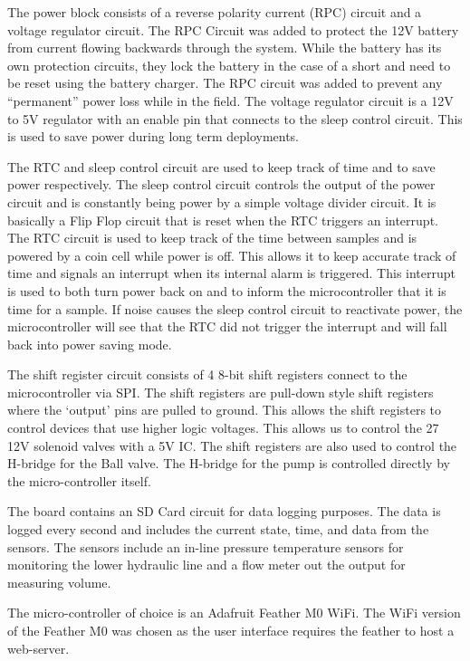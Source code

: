 \documentclass[11pt, letterpaper]{article}
\begin{document}
The power block consists of a reverse polarity current (RPC) circuit and a voltage regulator circuit. The RPC Circuit was added to protect the 12V battery from current flowing backwards through the system. While the battery has its own protection circuits, they lock the battery in the case of a short and need to be reset using the battery charger. The RPC circuit was added to prevent any “permanent” power loss while in the field. The voltage regulator circuit is a 12V to 5V regulator with an enable pin that connects to the sleep control circuit. This is used to save power during long term deployments. 
\newline\par\noindent
The RTC and sleep control circuit are used to keep track of time and to save power respectively. The sleep control circuit controls the output of the power circuit and is constantly being power by a simple voltage divider circuit. It is basically a Flip Flop circuit that is reset when the RTC triggers an interrupt. The RTC circuit is used to keep track of the time between samples and is powered by a coin cell while power is off. This allows it to keep accurate track of time and signals an interrupt when its internal alarm is triggered. This interrupt is used to both turn power back on and to inform the microcontroller that it is time for a sample. If noise causes the sleep control circuit to reactivate power, the microcontroller will see that the RTC did not trigger the interrupt and will fall back into power saving mode. 
\newline\par\noindent
The shift register circuit consists of 4 8-bit shift registers connect to the microcontroller via SPI. The shift registers are pull-down style shift registers where the ‘output’ pins are pulled to ground. This allows the shift registers to control devices that use higher logic voltages. This allows us to control the 27 12V solenoid valves with a 5V IC. The shift registers are also used to control the H-bridge for the Ball valve. The H-bridge for the pump is controlled directly by the micro-controller itself. 
\newline\par\noindent
The board contains an SD Card circuit for data logging purposes. The data is logged every second and includes the current state, time, and data from the sensors. The sensors include an in-line pressure temperature sensors for monitoring the lower hydraulic line and a flow meter out the output for measuring volume.
\newline\par\noindent
The micro-controller of choice is an Adafruit Feather M0 WiFi. The WiFi version of the Feather M0 was chosen as the user interface requires the feather to host a web-server. 
\end{document}
